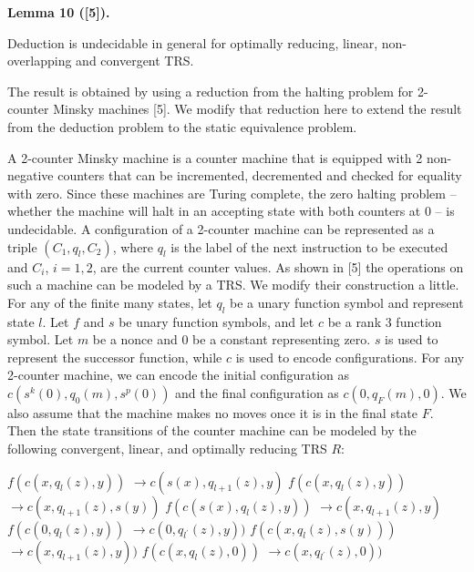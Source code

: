  
 
\par\medskip\noindent\textbf{Lemma 10 ([5]).}\par
 
 
Deduction is undecidable in general for optimally reducing, linear, non-overlapping and convergent TRS.\par
 
 
 
 
The result is obtained by using a reduction from the halting problem for 2-counter Minsky machines [5]. We modify that reduction here to extend the result from the deduction problem to the static equivalence problem.\par
 
 
 
A 2-counter Minsky machine is a counter machine that is equipped with 2 non-negative counters that can be incremented, decremented and checked for equality with zero. Since these machines are Turing complete, the zero halting problem – whether the machine will halt in an accepting state with both counters at 0 – is undecidable. A configuration of a 2-counter machine can be represented as a triple $(C_{1},q_{l},C_{2})$, where $q_{l}$ is the label of the next instruction to be executed and $C_{i}$, $i=1,2$, are the current counter values. As shown in [5] the operations on such a machine can be modeled by a TRS. We modify their construction a little. For any of the finite many states, let $q_{l}$ be a unary function symbol and represent state $l$. Let $f$ and $s$ be unary function symbols, and let $c$ be a rank 3 function symbol. Let $m$ be a nonce and $0$ be a constant representing zero. $s$ is used to represent the successor function, while $c$ is used to encode configurations. For any 2-counter machine, we can encode the initial configuration as $c(s^{k}(0),q_{0}(m),s^{p}(0))$ and the final configuration as $c(0,q_{F}(m),0)$. We also assume that the machine makes no moves once it is in the final state $F$. Then the state transitions of the counter machine can be modeled by the following convergent, linear, and optimally reducing TRS $R$:\par
    $\displaystyle f(c(x,q_{l}(z),y))$ $\displaystyle\rightarrow c(s(x),q_{l+1}(z),y)$     $\displaystyle f(c(x,q_{l}(z),y))$ $\displaystyle\rightarrow c(x,q_{l+1}(z),s(y))$     $\displaystyle f(c(s(x),q_{l}(z),y))$ $\displaystyle\rightarrow c(x,q_{l+1}(z),y)$     $\displaystyle f(c(0,q_{l}(z),y))$ $\displaystyle\rightarrow c(0,q_{l^{\prime}}(z),y))$     $\displaystyle f(c(x,q_{l}(z),s(y)))$ $\displaystyle\rightarrow c(x,q_{l+1}(z),y))$     $\displaystyle f(c(x,q_{l}(z),0))$ $\displaystyle\rightarrow c(x,q_{l^{\prime}}(z),0))$    
 
